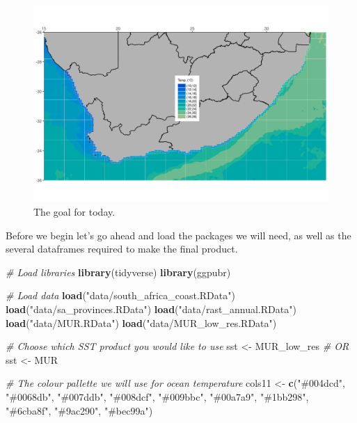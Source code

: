 \documentclass[
]{book}
\newenvironment{Shaded}{\begin{snugshade}}{\end{snugshade}}
\newcommand{\CommentTok}[1]{\textcolor[rgb]{0.56,0.35,0.01}{\textit{#1}}}
\newcommand{\KeywordTok}[1]{\textcolor[rgb]{0.13,0.29,0.53}{\textbf{#1}}}
\newcommand{\NormalTok}[1]{#1}
\newcommand{\StringTok}[1]{\textcolor[rgb]{0.31,0.60,0.02}{#1}}
\begin{document}
\begin{figure}

{\centering \includegraphics[width=1\linewidth]{figures/map_complete} 

}

\caption{The goal for today.}\label{fig:map-goal}
\end{figure}

Before we begin let's go ahead and load the packages we will need, as well as the several dataframes required to make the final product.

\begin{Shaded}
\begin{Highlighting}[]
\CommentTok{\# Load libraries}
\KeywordTok{library}\NormalTok{(tidyverse)}
\KeywordTok{library}\NormalTok{(ggpubr)}

\CommentTok{\# Load data}
\KeywordTok{load}\NormalTok{(}\StringTok{"data/south\_africa\_coast.RData"}\NormalTok{)}
\KeywordTok{load}\NormalTok{(}\StringTok{"data/sa\_provinces.RData"}\NormalTok{)}
\KeywordTok{load}\NormalTok{(}\StringTok{"data/rast\_annual.RData"}\NormalTok{)}
\KeywordTok{load}\NormalTok{(}\StringTok{"data/MUR.RData"}\NormalTok{)}
\KeywordTok{load}\NormalTok{(}\StringTok{"data/MUR\_low\_res.RData"}\NormalTok{)}

\CommentTok{\# Choose which SST product you would like to use}
\NormalTok{sst <{-}}\StringTok{ }\NormalTok{MUR\_low\_res}
\CommentTok{\# OR}
\NormalTok{sst <{-}}\StringTok{ }\NormalTok{MUR}

\CommentTok{\# The colour pallette we will use for ocean temperature}
\NormalTok{cols11 <{-}}\StringTok{ }\KeywordTok{c}\NormalTok{(}\StringTok{"\#004dcd"}\NormalTok{, }\StringTok{"\#0068db"}\NormalTok{, }\StringTok{"\#007ddb"}\NormalTok{, }\StringTok{"\#008dcf"}\NormalTok{, }\StringTok{"\#009bbc"}\NormalTok{,}
            \StringTok{"\#00a7a9"}\NormalTok{, }\StringTok{"\#1bb298"}\NormalTok{, }\StringTok{"\#6cba8f"}\NormalTok{, }\StringTok{"\#9ac290"}\NormalTok{, }\StringTok{"\#bec99a"}\NormalTok{)}
\end{Highlighting}
\end{Shaded}
\end{document}
